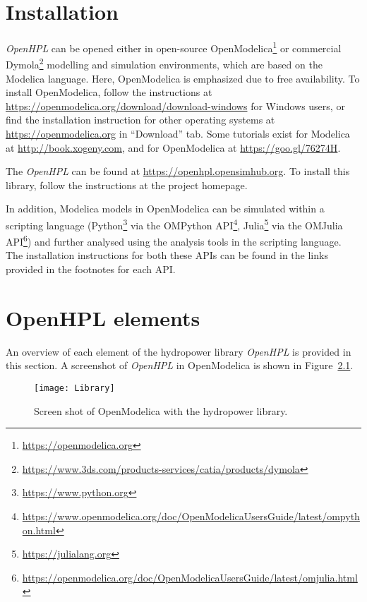 \documentclass[%
]{USN-PhD}
\begin{document}
\chapter{Installation}

\emph{OpenHPL} can be opened either in open-source OpenModelica\footnote{\url{https://openmodelica.org}} or commercial Dymola\footnote{\url{https://www.3ds.com/products-services/catia/products/dymola}} modelling and simulation environments, which are based on the Modelica language. Here, OpenModelica is emphasized due to free availability. To install OpenModelica, follow the instructions at \url{https://openmodelica.org/download/download-windows} for Windows users, or find the installation instruction for other operating systems at \url{https://openmodelica.org} in ``Download'' tab. Some tutorials exist for Modelica at \url{http://book.xogeny.com}, and for OpenModelica at \url{https://goo.gl/76274H}.

The \emph{OpenHPL} can be found at \url{https://openhpl.opensimhub.org}. To install this library, follow the instructions at the project homepage.

In addition, Modelica models in OpenModelica can be simulated within a scripting language (Python\footnote{\url{https://www.python.org}} via the OMPython API\footnote{\url{https://www.openmodelica.org/doc/OpenModelicaUsersGuide/latest/ompython.html}}, Julia\footnote{\url{https://julialang.org}} via the OMJulia API\footnote{\url{https://openmodelica.org/doc/OpenModelicaUsersGuide/latest/omjulia.html}}) and further analysed using the analysis tools in the scripting language. The installation instructions for both these APIs can be found in the links provided in the footnotes for each API.

\chapter{OpenHPL elements}

An overview of each element of the hydropower library \emph{OpenHPL} is provided in this section. A screenshot of \emph{OpenHPL} in OpenModelica is shown in Figure~\ref{fig:Library}.

\begin{figure}[!ht]
  \centering
 \texttt{[image: Library]}
 \caption{Screen shot of OpenModelica with the hydropower library.}
  \label{fig:Library}
\end{figure}
\end{document}
